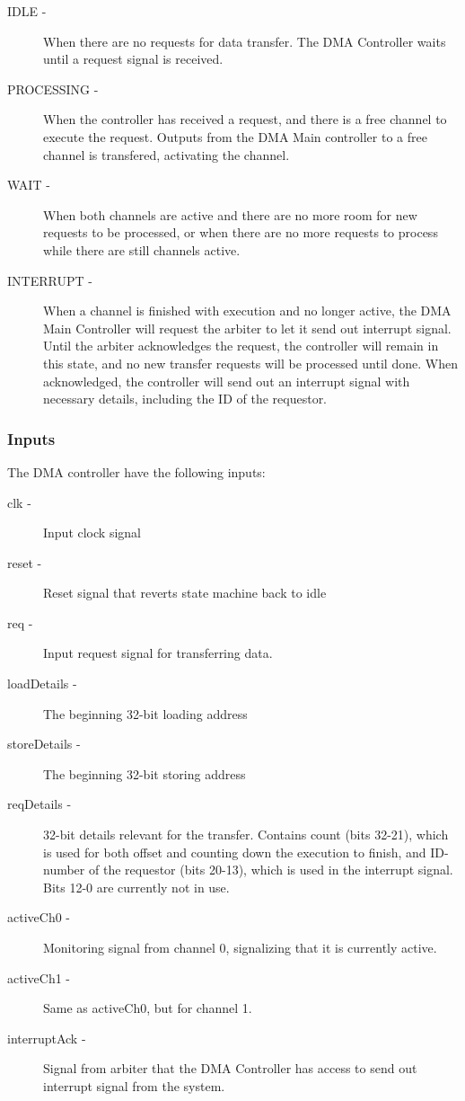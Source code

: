 \begin{appendix}
\begin{description}
    \item[IDLE -] 
    When there are no requests for data transfer.
    The DMA Controller waits until a request signal is received.
    \item[PROCESSING -] 
    When the controller has received a request, and there is a free channel to execute the request.
    Outputs from the DMA Main controller to a free channel is transfered, activating the channel.
    \item[WAIT -]
    When both channels are active and there are no more room for new requests to be processed, or when there are no more requests to process while there are still channels active.
    \item [INTERRUPT -]
    When a channel is finished with execution and no longer active, the DMA Main Controller will request the arbiter to let it send out interrupt signal.
    Until the arbiter acknowledges the request, the controller will remain in this state, and no new transfer requests will be processed until done.
    When acknowledged, the controller will send out an interrupt signal with necessary details, including the ID of the requestor.  
\end{description}

\subsubsection{Inputs}
The DMA controller have the following inputs:

\begin{description}
    \item[clk -]
    Input clock signal
    \item[reset -]
    Reset signal that reverts state machine back to idle
    \item[req -]
    Input request signal for transferring data.
    \item[loadDetails -]
    The beginning 32-bit loading address
    \item[storeDetails -]
    The beginning 32-bit storing address
    \item[reqDetails -]
    32-bit details relevant for the transfer.
    Contains count (bits 32-21), which is used for both offset and counting down the execution to finish, and ID-number of the requestor (bits 20-13), which is used in the interrupt signal.
    Bits 12-0 are currently not in use.
    \item[activeCh0 -]
    Monitoring signal from channel 0, signalizing that it is currently active.
    \item[activeCh1 -]
    Same as activeCh0, but for channel 1.
    \item[interruptAck -]
    Signal from arbiter that the DMA Controller has access to send out interrupt signal from the system.
\end{description}


\end{appendix}
